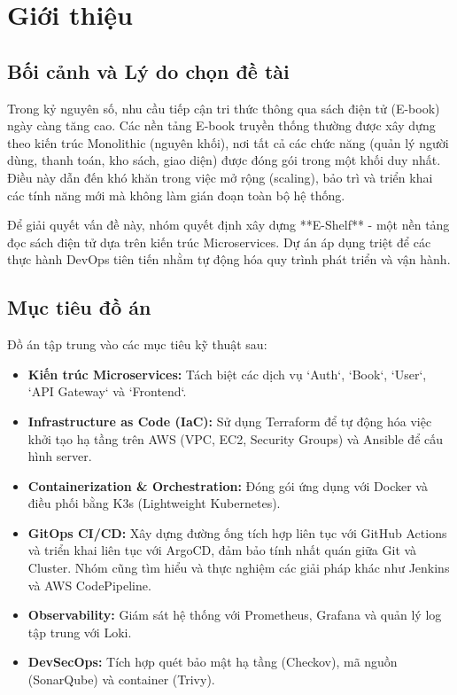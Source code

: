\documentclass[12pt, a4paper]{article}
\begin{document}
\tableofcontents
\pagebreak
\listoffigures
\pagebreak


\section{Giới thiệu}

\subsection{Bối cảnh và Lý do chọn đề tài}
Trong kỷ nguyên số, nhu cầu tiếp cận tri thức thông qua sách điện tử (E-book) ngày càng tăng cao. Các nền tảng E-book truyền thống thường được xây dựng theo kiến trúc Monolithic (nguyên khối), nơi tất cả các chức năng (quản lý người dùng, thanh toán, kho sách, giao diện) được đóng gói trong một khối duy nhất. Điều này dẫn đến khó khăn trong việc mở rộng (scaling), bảo trì và triển khai các tính năng mới mà không làm gián đoạn toàn bộ hệ thống.

Để giải quyết vấn đề này, nhóm quyết định xây dựng **E-Shelf** - một nền tảng đọc sách điện tử dựa trên kiến trúc Microservices. Dự án áp dụng triệt để các thực hành DevOps tiên tiến nhằm tự động hóa quy trình phát triển và vận hành.

\subsection{Mục tiêu đồ án}
Đồ án tập trung vào các mục tiêu kỹ thuật sau:
\begin{itemize}
    \item \textbf{Kiến trúc Microservices:} Tách biệt các dịch vụ `Auth`, `Book`, `User`, `API Gateway` và `Frontend`.
    \item \textbf{Infrastructure as Code (IaC):} Sử dụng Terraform để tự động hóa việc khởi tạo hạ tầng trên AWS (VPC, EC2, Security Groups) và Ansible để cấu hình server.
    \item \textbf{Containerization \& Orchestration:} Đóng gói ứng dụng với Docker và điều phối bằng K3s (Lightweight Kubernetes).
    \item \textbf{GitOps CI/CD:} Xây dựng đường ống tích hợp liên tục với GitHub Actions và triển khai liên tục với ArgoCD, đảm bảo tính nhất quán giữa Git và Cluster. Nhóm cũng tìm hiểu và thực nghiệm các giải pháp khác như Jenkins và AWS CodePipeline.
    \item \textbf{Observability:} Giám sát hệ thống với Prometheus, Grafana và quản lý log tập trung với Loki.
    \item \textbf{DevSecOps:} Tích hợp quét bảo mật hạ tầng (Checkov), mã nguồn (SonarQube) và container (Trivy).
\end{itemize}
\end{document}

